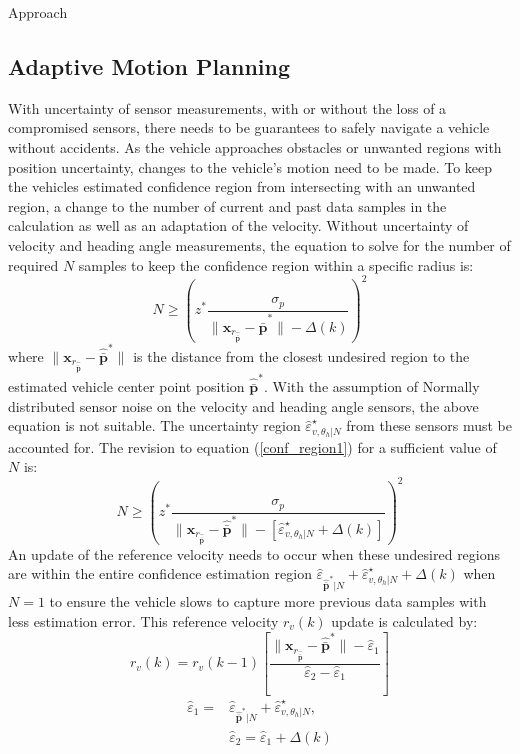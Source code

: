 \begin{section}{Approach}
\subsection{Adaptive Motion Planning}
With uncertainty of sensor measurements, with or without the loss of a compromised sensors, there needs to be guarantees to safely navigate a vehicle without accidents. As the vehicle approaches obstacles or unwanted regions with position uncertainty, changes to the vehicle's motion need to be made. To keep the vehicles estimated confidence region from intersecting with an unwanted region, a change to the number of current and past data samples in the calculation as well as an adaptation of the velocity. Without uncertainty of velocity and heading angle measurements, the equation to solve for the number of required $N$ samples to keep the confidence region within a specific radius is:
    \begin{equation}
    \label{conf_region1}
	    N \geq \left(z^{*} \frac{ \sigma_p }{ {\lVert \bm{x}_{r_{\hat{\bar{\bm{p}}}}} - \hat{\bar{\bm{p}}}^* \rVert} -\Delta(k) } \right)^2
	\end{equation}
where $\lVert {\bm{x}_{r_{\hat{\bar{\bm{p}}}}}-\hat{\bar{\bm{p}}}^*} \rVert$ is the distance from the closest undesired region to the estimated vehicle center point position $\hat{\bar{\bm{p}}}^*$.
With the assumption of Normally distributed sensor noise on the velocity and heading angle sensors, the above equation is not suitable. The uncertainty region $\hat{\varepsilon}_{v,\theta_h|N}^{\star}$ from these sensors must be accounted for. The revision to equation (\ref{conf_region1}) for a sufficient value of $N$ is:
    \begin{equation}
	    N \geq \left(z^{*} \frac{ \sigma_p }{ {\lVert \bm{x}_{r_{\hat{\bar{\bm{p}}}}} - \hat{\bar{\bm{p}}}^* \rVert} -[\hat{\varepsilon}_{v,\theta_h|N}^{\star}+\Delta(k)] } \right)^2
	\end{equation}
An update of the reference velocity needs to occur when these undesired regions are within the entire confidence estimation region $ \hat{\varepsilon}_{\hat{\bar{\bm{p}}}^*|N} +\hat{\varepsilon}_{v,\theta_h|N}^{\star}+\Delta(k)$ when $N=1$ to ensure the vehicle slows to capture more previous data samples with less estimation error. This reference velocity $r_v(k)$ update is calculated by:
    \begin{equation}
	    r_v(k)=r_v(k-1) \left[ \frac{\lVert \bm{x}_{r_{\hat{\bar{\bm{p}}}}} - \hat{\bar{\bm{p}}}^* \rVert - \hat{\varepsilon}_1}{\hat{\varepsilon}_2 - \hat{\varepsilon}_1} \right]
	\end{equation}
	\begin{equation}
	\begin{split}
	    \hat{\varepsilon}_1=&\hat{\varepsilon}_{\hat{\bar{\bm{p}}}^*|N} +\hat{\varepsilon}_{v,\theta_h|N}^{\star},\\ &\hat{\varepsilon}_2=\hat{\varepsilon}_1+\Delta(k) \nonumber	    
	\end{split}
	\end{equation}
	

\end{section}
